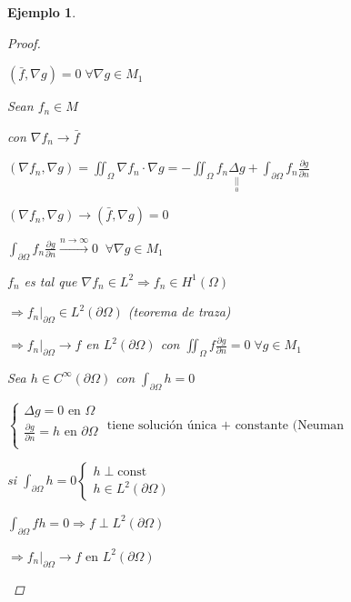 \documentclass[a4paper,10pt]{book}
\newtheorem{ejemplo}{Ejemplo}
\begin{document}
\begin{ejemplo}
\begin{proof}
\begin{enumerate}
         $(\bar{f},\nabla g) = 0 \; \forall \nabla g \in M_1$

         Sean $f_n\in M$

         con $\nabla f_n \rightarrow \bar{f}$

         $(\nabla f_n , \nabla g) = \iint_\Omega \nabla f_n\cdot \nabla g = - \iint_\Omega f_n \underset{\underset{0}{||}}{\Delta g} + \int_{\partial \Omega} f_n \frac{\partial g}{\partial n} $


         $(\nabla f_n , \nabla g) \rightarrow (\bar{f},\nabla g)=0$

         $\int_{\partial \Omega} f_n \frac{\partial g}{\partial n}  \overset{n\rightarrow \infty}{\rightarrow}0 \;\; \forall \nabla g \in M_1$

         $f_n$ es tal que $\nabla f_n \in L^2 \Rightarrow f_n \in H^1 (\Omega) $

        $\Rightarrow f_n|_{\partial \Omega } \in L^2 (\partial \Omega) $ (teorema de traza)

        $\Rightarrow f_n |_{\partial \Omega} \rightarrow f$  en $L^2(\partial \Omega) $ con $\iint_\Omega f \frac{\partial g}{ \partial n} = 0 \; \forall g \in M_1$

        Sea $h\in C^\infty(\partial \Omega) $ con $\int _{\partial\Omega } h= 0$

        $ \left\{\begin{aligned}
        \Delta g = 0 \text{ en } \Omega \\
        \frac{\partial g}{\partial n }= h \text{ en } \partial \Omega \\
       \end{aligned} \text{ tiene solución única + constante (Neuman }
        \right. $

        si $\int_{\partial \Omega } h  = 0  \left\{   \begin{aligned}
            h \perp \text{const}\\
            h \in L^2(\partial\Omega)
        \end{aligned}
        \right.
        $
        
        $\int_{\partial \Omega} f h = 0 \Rightarrow f\perp L^2(\partial \Omega) $

        $\Rightarrow f_n |_{\partial \Omega} \rightarrow f \text{ en } L^2(\partial \Omega) $

        
     \end{enumerate}
        


        
        
        
    
    \end{proof}


    
\end{ejemplo}
\end{document}
